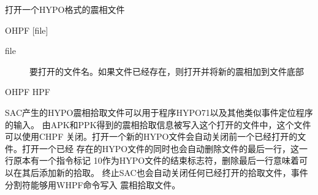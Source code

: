 \label{cmd:ohpf}

打开一个HYPO格式的震相文件

\begin{SACSTX}
OHPF [file]
\end{SACSTX}

\begin{description}
\item [file]  要打开的文件名。如果文件已经存在，则打开并将新的震相加到文件底部
\end{description}

\begin{SACDFT}
OHPF HPF
\end{SACDFT}

SAC产生的HYPO震相拾取文件可以用于程序HYPO71以及其他类似事件定位程序的输入。
由APK和PPK得到的震相拾取信息被写入这个打开的文件中，这个文件可以使用CHPF
关闭。打开一个新的HYPO文件会自动关闭前一个已经打开的文件。打开一个已经
存在的HYPO文件的同时也会自动删除文件的最后一行，这一行原本有一个指令标记
10作为HYPO文件的结束标志符，删除最后一行意味着可以在其后添加新的拾取。
终止SAC也会自动关闭任何已经打开的拾取文件，事件分割符能够用WHPF命令写入
震相拾取文件。
